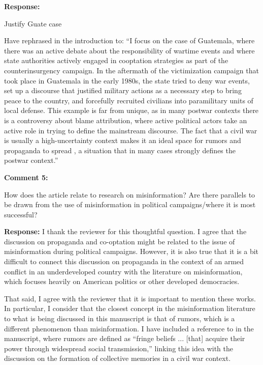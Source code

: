 \documentclass[12pt, a4paper, notitlepage]{article}
\begin{document}
\noindent\textbf{Response:} {}

Justify Guate case

Have rephrased in the introduction to:
``I focus on the case of Guatemala, where there was an active debate about the responsibility of wartime events and where state authorities actively engaged in cooptation strategies as part of the counterinsurgency campaign.
In the aftermath of the victimization campaign that took place in Guatemala in the early 1980s, the state tried to deny war events, set up a discourse that justified military actions as a necessary step to bring peace to the country, and forcefully recruited civilians into paramilitary units of local defense.
This example is far from unique, as in many postwar contexts there is a controversy about blame attribution, where active political actors take an active role in trying to define the mainstream discourse.
The fact that a civil war is usually a high-uncertainty context makes it an ideal space for rumors and propaganda to spread \citep{Schon:2021wf}, a situation that in many cases strongly defines the postwar context.''

\vspace{15pt}
\noindent\textbf{Comment 5:}
\begin{displayquote}
How does the article relate to research on misinformation? Are there parallels to be drawn from the use of misinformation in political campaigns/where it is most successful?
\end{displayquote}

\noindent\textbf{Response:} I thank the reviewer for this thoughtful question. I agree that the discussion on propaganda and co-optation might be related to the issue of misinformation during political campaigns. However, it is also true that it is a bit difficult to connect this discussion on propaganda in the context of an armed conflict in an underdeveloped country with the literature on misinformation, which focuses heavily on American politics or other developed democracies.

That said, I agree with the reviewer that it is important to mention these works. In particular, I consider that the closest concept in the misinformation literature to what is being discussed in this manuscript is that of rumors, which is a different phenomenon than misinformation. I have included a reference to \citet[243]{Berinsky:2017ty} in the manuscript, where rumors are defined as ``fringe beliefs ... [that] acquire their power through widespread social transmission,'' linking this idea with the discussion on the formation of collective memories in a civil war context.
\end{document}
